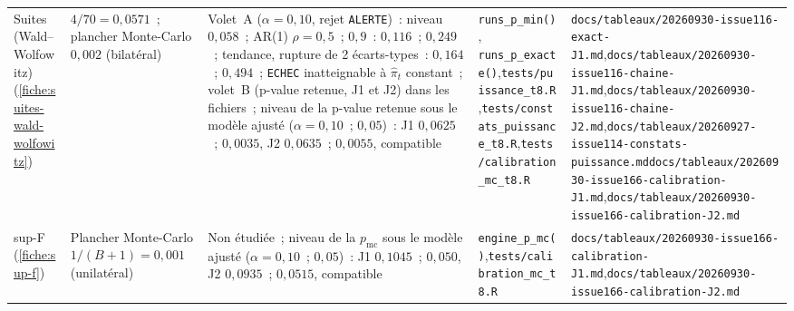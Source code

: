 \documentclass[a4paper,11pt]{article}
\newcommand{\code}[1]{\texttt{\small #1}}
\begin{document}
\begin{landscape}
\begin{center}
\begin{longtable}{@{}>{\raggedright\arraybackslash}p{2.5cm}>{\raggedright\arraybackslash}p{3.6cm}>{\raggedright\arraybackslash}p{4.0cm}>{\raggedright\arraybackslash}p{6.7cm}>{\raggedright\arraybackslash}p{7.2cm}@{}}
Suites (Wald--Wolfowitz) (\ref{fiche:suites-wald-wolfowitz}) & $4/70 = 0{,}0571$~; plancher Monte-Carlo $0{,}002$ (bilatéral) & Volet~A ($\alpha = 0{,}10$, rejet \code{ALERTE})~: niveau $0{,}058$~; AR(1) $\rho = 0{,}5$~; $0{,}9$~: $0{,}116$~; $0{,}249$~; tendance, rupture de 2 écarts-types~: $0{,}164$~; $0{,}494$~; \code{ECHEC} inatteignable à $\hat\pi_t$ constant~; volet~B (p-value retenue, J1 et J2) dans les fichiers~; niveau de la p-value retenue sous le modèle ajusté ($\alpha = 0{,}10$~; $0{,}05$)~: J1 $0{,}0625$~; $0{,}0035$, J2 $0{,}0635$~; $0{,}0055$, compatible & \code{runs\_p\_min()}, \code{runs\_p\_exacte()},\newline \code{tests/puissance\_t8.R},\newline \code{tests/constats\_puissance\_t8.R},\newline \code{tests/calibration\_mc\_t8.R} & \code{docs/tableaux/}\newline \code{20260930-issue116-exact-J1.md},\newline \code{docs/tableaux/}\newline \code{20260930-issue116-chaine-J1.md},\newline \code{docs/tableaux/}\newline \code{20260930-issue116-chaine-J2.md},\newline \code{docs/tableaux/}\newline \code{20260927-issue114-constats-puissance.md}\newline \code{docs/tableaux/}\newline \code{20260930-issue166-calibration-J1.md},\newline \code{docs/tableaux/}\newline \code{20260930-issue166-calibration-J2.md} \\
sup-F (\ref{fiche:sup-f}) & Plancher Monte-Carlo $1/(B+1) = 0{,}001$ (unilatéral) & Non étudiée~; niveau de la $p_{\mathrm{mc}}$ sous le modèle ajusté ($\alpha = 0{,}10$~; $0{,}05$)~: J1 $0{,}1045$~; $0{,}050$, J2 $0{,}0935$~; $0{,}0515$, compatible & \code{engine\_p\_mc()},\newline \code{tests/calibration\_mc\_t8.R} & \code{docs/tableaux/}\newline \code{20260930-issue166-calibration-J1.md},\newline \code{docs/tableaux/}\newline \code{20260930-issue166-calibration-J2.md} \\

\end{longtable}
\end{center}
\end{landscape}
\end{document}
